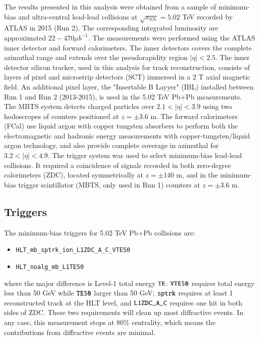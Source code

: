 The results presented in this analysis were obtained from a sample of minimum-bias and ultra-central lead-lead collisions at $\sqrt{s_{\text{NN}}}=5.02$ TeV recorded by ATLAS in 2015 (Run 2). The corresponding integrated luminosity are approximated $22-470 \mu b^{-1}$. The measurements were performed using the ATLAS inner detector and forward calorimeters. The inner detectors covers the complete azimuthal range and extends over the pseudorapidity region $|\eta|<2.5$. The inner detector silicon tracker, used in this analysis for track reconstruction, consists of layers of pixel and microstrip detectors (SCT) immersed in a 2 T axial magnetic field. An additional pixel layer, the "Insertable B Layyer" (IBL) installed between Run 1 and Run 2 (2013-2015), is used in the 5.02 TeV Pb+Pb measurements. The MBTS system detects charged particles over $2.1<|\eta|<3.9$ using two hodoscropes of counters positioned at $z=\pm 3.6$ m. The forward calorimeters (FCal) use liquid argon with copper tungsten absorbers to perform both the electromagnetic and hadronic energy measurements with copper-tungsten/liquid argon technology, and also provide complete coverage in azimuthal for $3.2<|\eta|<4.9$. The trigger system was used to select minimum-bias lead-lead collisions. It required a coincidence of signals recorded in both zero-degree calorimeters (ZDC), located symmetrically at $z=\pm 140$ m, and in the minimum-bias trigger scintillator (MBTS, only used in Run 1) counters at $z=\pm 3.6$ m.



\subsection{Triggers}
The minimum-bias triggers for 5.02 TeV Pb+Pb collisions are:
\begin{itemize}
\item \verb|HLT_mb_sptrk_ion_L1ZDC_A_C_VTE50|
\item \verb|HLT_noalg_mb_L1TE50|
\end{itemize}
where the major difference is Level-1 total energy $\verb|TE|$: $\verb|VTE50|$ requires total energy less than 50 GeV while $\verb|TE50|$ larger than 50 GeV; $\verb|sptrk|$ requires at least 1 reconstructed track at the HLT level, and $\verb|L1ZDC_A_C|$ requires one hit in both sides of ZDC. These two requirements will clean up most diffractive events. In any case, this measurement stops at $80\%$ centrality, which means the contributions from diffractive events are minimal.

